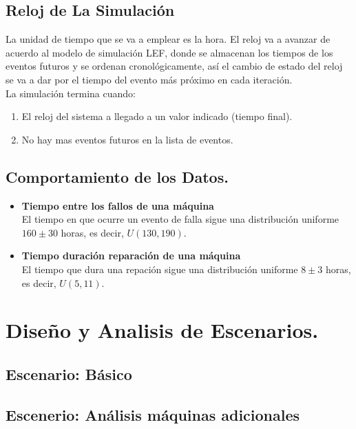 \documentclass[12pt]{article}
\begin{document}
\subsection{Reloj de La Simulación}

La unidad de tiempo que se va a emplear es la hora. El reloj va a avanzar de acuerdo al modelo de simulación LEF, donde se almacenan los tiempos de los eventos futuros y se ordenan cronológicamente, así el cambio de estado del reloj  se va a dar por el tiempo del evento más próximo en cada iteración.\\

La simulación termina cuando:
\begin{enumerate}
\item El reloj del sistema a llegado a un valor indicado (tiempo final).
\item No hay mas eventos futuros en la lista de eventos.
\end{enumerate}

\subsection{Comportamiento de los Datos.}

\begin{itemize}
\item \textbf{Tiempo entre los fallos de una m\'aquina}\\
El tiempo en que ocurre un evento de falla sigue una distribución uniforme $160\pm30$ horas, es decir,  $U(130,190)$.

\item \textbf{Tiempo duraci\'on reparaci\'on de una m\'aquina}\\
El tiempo que dura una repaci\'on sigue una distribuci\'on uniforme $8\pm3$ horas, es decir, $U(5,11)$.

\end{itemize}



\section{Diseño y Analisis de Escenarios.}

\subsection{Escenario: B\'asico}
\subsection{Escenerio: An\'alisis m\'aquinas adicionales}
\end{document}
